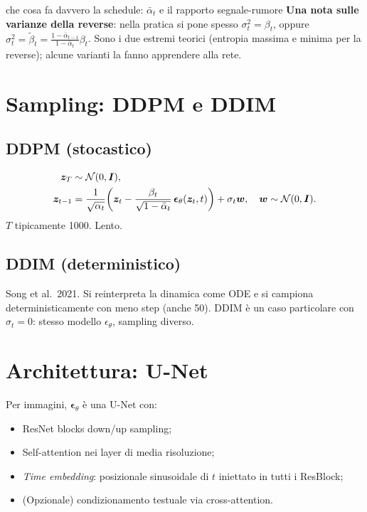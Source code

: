 \begin{esempiosvolto}{che cosa fa davvero la schedule: $\bar\alpha_t$ e il rapporto segnale-rumore}
\textbf{Una nota sulle varianze della reverse}: nella pratica si pone spesso $\sigma_t^2 = \beta_t$, oppure $\sigma_t^2 = \tilde\beta_t = \frac{1-\bar\alpha_{t-1}}{1-\bar\alpha_t}\beta_t$. Sono i due estremi teorici (entropia massima e minima per la reverse); alcune varianti la fanno apprendere alla rete.
\end{esempiosvolto}

\section{Sampling: DDPM e DDIM}

\subsection{DDPM (stocastico)}
\begin{align*}
\bm{z}_T &\sim \mathcal{N}(0, \bm{I}),\\
\bm{z}_{t-1} &= \frac{1}{\sqrt{\alpha_t}}\!\left(\bm{z}_t - \frac{\beta_t}{\sqrt{1-\bar\alpha_t}}\,\boldsymbol{\epsilon}_\theta(\bm{z}_t, t)\right) + \sigma_t \bm{w},\quad \bm{w} \sim \mathcal{N}(0,\bm{I}).
\end{align*}
$T$ tipicamente 1000. Lento.

\subsection{DDIM (deterministico)}
Song et al.\ 2021. Si reinterpreta la dinamica come ODE e si campiona deterministicamente con meno step (anche 50). DDIM è un caso particolare con $\sigma_t = 0$: stesso modello $\epsilon_\theta$, sampling diverso.

\section{Architettura: U-Net}

Per immagini, $\boldsymbol{\epsilon}_\theta$ è una U-Net con:
\begin{itemize}
  \item ResNet blocks down/up sampling;
  \item Self-attention nei layer di media risoluzione;
  \item \emph{Time embedding}: posizionale sinusoidale di $t$ iniettato in tutti i ResBlock;
  \item (Opzionale) condizionamento testuale via cross-attention.
\end{itemize}

